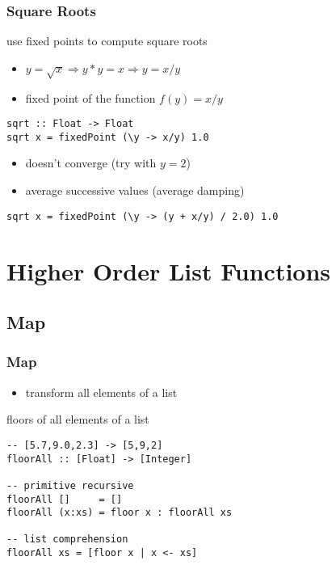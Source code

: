 \documentclass[dvipsnames]{beamer}
\theoremstyle{plain}
\begin{document}
\begin{frame}[fragile]
  \frametitle{Square Roots}

  \begin{exampleblock}{use fixed points to compute square roots}
    \begin{itemize}
      \item $y = \sqrt{x} \Rightarrow y * y = x \Rightarrow y = x / y$
      \item fixed point of the function $f(y) = x / y$
    \end{itemize}

    \smallskip
    \begin{lstlisting}
sqrt :: Float -> Float
sqrt x = fixedPoint (\y -> x/y) 1.0
    \end{lstlisting}
  \end{exampleblock}

  \pause
  \vspace{-6pt}
  \begin{itemize}
    \item doesn't converge (try with $y=2$)
    \item average successive values (average damping)
  \end{itemize}

  \begin{exampleblock}{}
    \begin{lstlisting}
sqrt x = fixedPoint (\y -> (y + x/y) / 2.0) 1.0
    \end{lstlisting}
  \end{exampleblock}
\end{frame}

\section{Higher Order List Functions}

\subsection{Map}

\begin{frame}[fragile]
  \frametitle{Map}

  \begin{itemize}
    \item transform all elements of a list
  \end{itemize}

  \begin{exampleblock}{floors of all elements of a list}
    \begin{lstlisting}
-- [5.7,9.0,2.3] -> [5,9,2]
floorAll :: [Float] -> [Integer]

-- primitive recursive
floorAll []     = []
floorAll (x:xs) = floor x : floorAll xs

-- list comprehension
floorAll xs = [floor x | x <- xs]
    \end{lstlisting}
  \end{exampleblock}
\end{frame}
\end{document}
